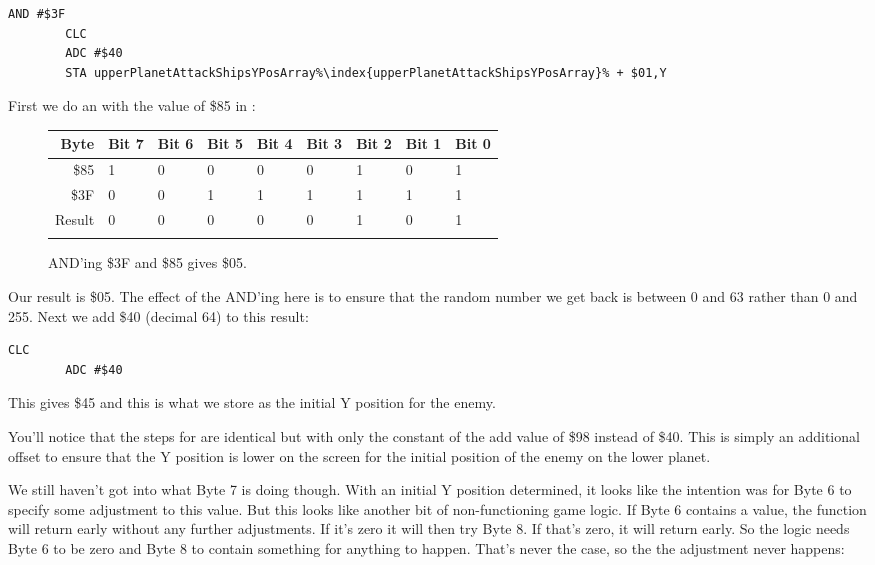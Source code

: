 \begin{lstlisting}[escapechar=\%]
        AND #$3F
        CLC
        ADC #$40
        STA upperPlanetAttackShipsYPosArray%\index{upperPlanetAttackShipsYPosArray}% + $01,Y
\end{lstlisting}

First we do an  with the value of \$85 in :
\begin{figure}[H]
  {
    \setlength{\tabcolsep}{3.0pt}
    \setlength\cmidrulewidth{\heavyrulewidth} %
    \begin{adjustbox}{width=10cm,center}

      \begin{tabular}{rllllllll}
        \toprule
        Byte & Bit 7 & Bit 6 & Bit 5 & Bit 4 & Bit 3 & Bit 2 & Bit 1 & Bit 0        \\
        \midrule
        \$85 & 1 & 0 & 0 & 0 & 0 & 1 & 0 & 1 \\
        \$3F & 0 & 0 & 1 & 1 & 1 & 1 & 1 & 1 \\
        \midrule
        Result & 0 & 0 & 0 & 0 & 0 & 1 & 0 & 1 \\
        \addlinespace
        \bottomrule
      \end{tabular}

    \end{adjustbox}

    }\caption*{AND'ing \$3F and \$85 gives \$05.}
\end{figure}

Our result is \$05. The effect of the AND'ing here is to ensure that the random number we get back is between 0 and 63 rather
than 0 and 255. Next we add \$40 (decimal 64) to this result:

\begin{lstlisting}[escapechar=\%]
        CLC
        ADC #$40
\end{lstlisting}

This gives \$45 and this is what we store as the initial Y position for the enemy.

You'll notice that the steps for  are identical but with only the constant of the
add value of \$98 instead of \$40. This is simply an additional offset to ensure that the Y position is lower on the screen
for the initial position of the enemy on the lower planet.

We still haven't got into what Byte 7 is doing though. With an initial Y position determined, it looks like the intention was
for Byte 6 to specify some adjustment to this value. But this looks like another bit of non-functioning game logic. If
Byte 6 contains a value, the function will return early without any further adjustments. If it's zero it will then try
Byte 8. If that's zero, it will return early. So the logic needs Byte 6 to be zero and Byte 8 to contain something for 
anything to happen. That's never the case, so the the adjustment never happens:

